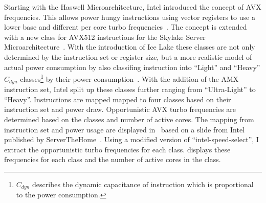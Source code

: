 Starting with the Haswell Microarchitecture, Intel introduced the concept of AVX frequencies.
This allows power hungy instructions using vector registers to use a lower base and different per core turbo frequencies~\cite{Hackenberg_2015_Haswell}.
The concept is extended with a new class for AVX512 instructions for the Skylake Server Microarchitecture~\cite[Sec. 2.6.3]{Intel_Optimization_Reference_Manual_050}.
With the introduction of Ice Lake these classes are not only determined by the instruction set or register size, but a more realistic model of actual power consumption by also classifing instruction into ``Light'' and ``Heavy'' $C_{dyn}$ classes\footnote{$C_{dyn}$ describes the dynamic capacitance of instruction which is proportional to the power consumption.} by their power consumption~\cite{papazian_new_2020}.
With the addition of the AMX instruction set, Intel split up these classes further ranging from ``Ultra-Light'' to ``Heavy''.
Instructions are mapped mapped to four classes based on their instruction set and power draw.
Opportunistic AVX turbo frequencies are determined based on the classes and number of active cores.
The mapping from instruction set and power usage are displayed in~ based on a slide from Intel published by ServerTheHome~\cite{ServeTheHome_Emerald_Rapids_2023}.
Using a modified version of ``intel-speed-select'', I extract the opportunistic turbo frequencies for each class.
 displays these frequencies for each class and the number of active cores in the class.


